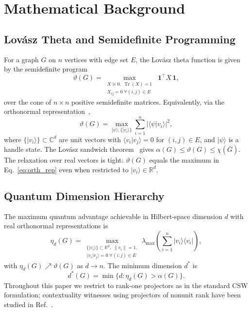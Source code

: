 \documentclass[aps,pra,twocolumn,superscriptaddress,longbibliography,floatfix]{revtex4-2}
\newcommand{\vt}{\vartheta}
\newcommand{\al}{\alpha}
\newcommand{\Tr}{\operatorname{Tr}}
\newcommand{\lmax}{\lambda_{\max}}
\begin{document}
\section{Mathematical Background}

\subsection{Lov\'{a}sz Theta and Semidefinite Programming}

For a graph $G$ on $n$ vertices with edge set $E$, the Lov\'{a}sz theta
function is given by the semidefinite program~\cite{Lovasz1979,Knuth1994}
\begin{equation}
  \vt(G) = \max_{\substack{X\succeq 0,\;\Tr(X)=1\\
            X_{ij}=0\;\forall(i,j)\in E}}\;
            \mathbf{1}^\top X\,\mathbf{1},
  \label{eq:sdp}
\end{equation}
over the cone of $n\times n$ positive semidefinite matrices.
Equivalently, via the orthonormal representation~\cite{Lovasz1979},
\begin{equation}
  \vt(G) = \max_{|\psi\rangle,\{|v_i\rangle\}}
           \sum_{i=1}^n |\langle\psi|v_i\rangle|^2,
  \label{eq:orth_rep}
\end{equation}
where $\{|v_i\rangle\}\subset\mathbb{C}^d$ are unit vectors with
$\langle v_i|v_j\rangle=0$ for $(i,j)\in E$, and $|\psi\rangle$ is a
handle state.
The Lov\'{a}sz sandwich theorem~\cite{Lovasz1979} gives
$\al(G)\leq\vt(G)\leq\chi(\bar{G})$.
The relaxation over real vectors is tight: $\vt(G)$ equals the maximum
in Eq.~\eqref{eq:orth_rep} even when restricted to $|v_i\rangle\in\mathbb{R}^d$.

\subsection{Quantum Dimension Hierarchy}

The maximum quantum advantage achievable in Hilbert-space dimension $d$
with real orthonormal representations is
\begin{equation}
  \eta_d(G) = \max_{\substack{\{|v_i\rangle\}\subset\mathbb{R}^d,\;
              \|v_i\|=1,\\\langle v_i|v_j\rangle=0\;\forall(i,j)\in E}}
  \lmax\!\!\left(\sum_{i=1}^n |v_i\rangle\!\langle v_i|\right),
  \label{eq:eta_d}
\end{equation}
with $\eta_d(G)\nearrow\vt(G)$ as $d\to n$.
The minimum dimension $d^*$ is
\begin{equation}
  d^*(G) = \min\{d : \eta_d(G)>\al(G)\}.
\end{equation}
Throughout this paper we restrict to rank-one projectors as in the
standard CSW formulation; contextuality witnesses using projectors of
nonunit rank have been studied in Ref.~\cite{Xu2021}.
\end{document}
